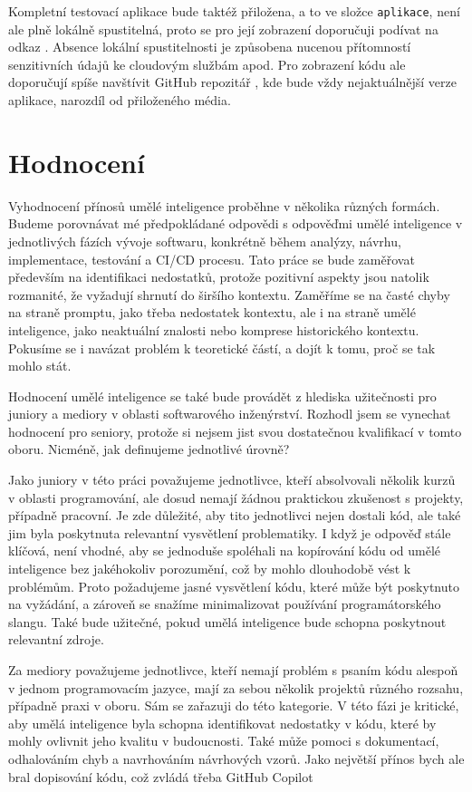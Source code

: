\documentclass[FM,DP]{tulthesis}
\begin{document}
    Kompletní testovací aplikace bude taktéž přiložena, a to ve složce \verb|aplikace|, není ale plně lokálně spustitelná, proto se pro její zobrazení doporučuji podívat na odkaz \cite{final_app}. Absence lokální spustitelnosti je způsobena nucenou přítomností senzitivních údajů ke cloudovým službám apod. Pro zobrazení kódu ale doporučují spíše navštívit GitHub repozitář \cite{gh_final_app}, kde bude vždy nejaktuálnější verze aplikace, narozdíl od přiloženého média. 
		
		\section{Hodnocení}
		Vyhodnocení přínosů umělé inteligence proběhne v několika různých formách. Budeme porovnávat mé předpokládané odpovědi s odpověďmi umělé inteligence v jednotlivých fázích vývoje softwaru, konkrétně během analýzy, návrhu, implementace, testování a CI/CD procesu. Tato práce se bude zaměřovat především na identifikaci nedostatků, protože pozitivní aspekty jsou natolik rozmanité, že vyžadují shrnutí do širšího kontextu. Zaměříme se na časté chyby na straně promptu, jako třeba nedostatek kontextu, ale i na straně umělé inteligence, jako neaktuální znalosti nebo komprese historického kontextu. Pokusíme se i navázat problém k teoretické částí, a dojít k tomu, proč se tak mohlo stát.
		
		Hodnocení umělé inteligence se také bude provádět z hlediska užitečnosti pro juniory a mediory v oblasti softwarového inženýrství. Rozhodl jsem se vynechat hodnocení pro seniory, protože si nejsem jist svou dostatečnou kvalifikací v tomto oboru. Nicméně, jak definujeme jednotlivé úrovně?
		
		Jako juniory v této práci považujeme jednotlivce, kteří absolvovali několik kurzů v oblasti programování, ale dosud nemají žádnou praktickou zkušenost s projekty, případně pracovní. Je zde důležité, aby tito jednotlivci nejen dostali kód, ale také jim byla poskytnuta relevantní vysvětlení problematiky. I když je odpověď stále klíčová, není vhodné, aby se jednoduše spoléhali na kopírování kódu od umělé inteligence bez jakéhokoliv porozumění, což by mohlo dlouhodobě vést k problémům. Proto požadujeme jasné vysvětlení kódu, které může být poskytnuto na vyžádání, a zároveň se snažíme minimalizovat používání programátorského slangu. Také bude užitečné, pokud umělá inteligence bude schopna poskytnout relevantní zdroje.
		
		Za mediory považujeme jednotlivce, kteří nemají problém s psaním kódu alespoň v jednom programovacím jazyce, mají za sebou několik projektů různého rozsahu, případně praxi v oboru. Sám se zařazuji do této kategorie. V této fázi je kritické, aby umělá inteligence byla schopna identifikovat nedostatky v kódu, které by mohly ovlivnit jeho kvalitu v budoucnosti. Také může pomoci s dokumentací, odhalováním chyb a navrhováním návrhových vzorů. Jako největší přínos bych ale bral dopisování kódu, což zvládá třeba GitHub Copilot \cite{gitCopilot}
		
\end{document}
